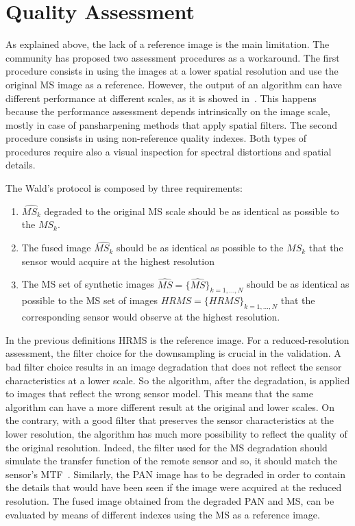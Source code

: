 \documentclass[12pt]{report}
\begin{document}
\section{Quality Assessment}
As explained above, the lack of a reference image is the main limitation. The community has proposed two assessment
procedures as a workaround. The first procedure consists in using the images at a lower spatial 
resolution and use the original MS image as a reference. However, the output of an algorithm can have 
different performance at different scales, as it is showed in~\cite{perfdiffscale}.
This happens because the performance assessment depends intrinsically on the image scale, 
mostly in case of pansharpening methods that apply spatial filters.
The second procedure consists in using non-reference quality indexes. 
Both types of procedures require also a visual inspection for spectral distortions and spatial details.

The Wald's protocol is composed by three requirements:
\begin{enumerate}
	\item $\widehat{MS_k}$ degraded to the original MS scale should be as identical as possible to the $MS_k$.
    \item The fused image $\widehat{MS_k}$ should be as identical as possible to the $MS_k$ that the sensor would acquire at the highest resolution
    \item The MS set of synthetic images $\widehat{MS} = {\{\widehat{MS}\}_{k=1,\dots,N}}$ should be as identical as possible
    to the MS set of images $HRMS = \{HRMS\}_{k=1,\dots,N}$ that the corresponding sensor would observe at the highest resolution.
\end{enumerate}

In the previous definitions HRMS is the reference image.
For a reduced-resolution assessment, the filter choice for the downsampling is crucial in the validation. 
A bad filter choice results in an image degradation that does not reflect the 
sensor characteristics at a lower scale. So the algorithm, after the degradation, is applied to
images that reflect the wrong sensor model. This means that the same algorithm can have a more different result at the original and lower scales. On the contrary, with a good filter that preserves the sensor characteristics at the lower resolution, the algorithm has much more possibility to reflect the quality of the original resolution.
Indeed, the filter used for the MS degradation should simulate the transfer function of the remote sensor and so, it should match the sensor's MTF~\cite{mtfsensor}. 
Similarly, the PAN image has to be degraded in order to contain the details that would have been seen if the image were acquired at the reduced resolution.
The fused image obtained from the degraded PAN and MS, can be evaluated by means of different indexes using the MS as a reference image.
\end{document}
